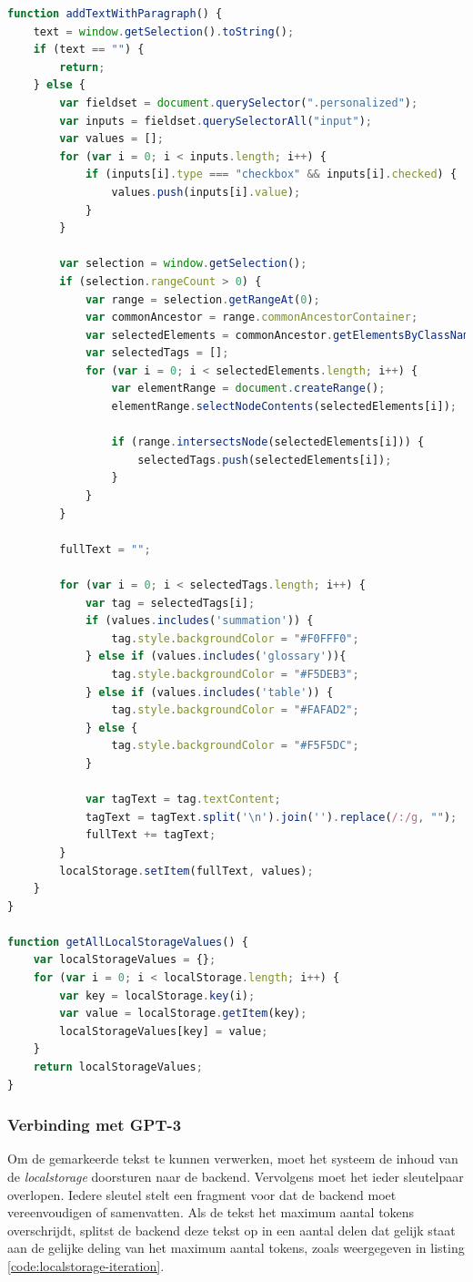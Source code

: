 \begin{lstlisting}[language=javascript, caption={Implementatie rond localstorage en tekst markeren.}, label={listing:localstorage}]
function addTextWithParagraph() {
	text = window.getSelection().toString();
	if (text == "") {
		return;
	} else {
		var fieldset = document.querySelector(".personalized");
		var inputs = fieldset.querySelectorAll("input");
		var values = [];
		for (var i = 0; i < inputs.length; i++) {
			if (inputs[i].type === "checkbox" && inputs[i].checked) {
				values.push(inputs[i].value);
			}
		}
		
		var selection = window.getSelection();
		if (selection.rangeCount > 0) {
			var range = selection.getRangeAt(0);
			var commonAncestor = range.commonAncestorContainer;
			var selectedElements = commonAncestor.getElementsByClassName("sentence");
			var selectedTags = [];
			for (var i = 0; i < selectedElements.length; i++) {
				var elementRange = document.createRange();
				elementRange.selectNodeContents(selectedElements[i]);
				
				if (range.intersectsNode(selectedElements[i])) {
					selectedTags.push(selectedElements[i]);
				}
			}
		}
		
		fullText = "";
		
		for (var i = 0; i < selectedTags.length; i++) {
			var tag = selectedTags[i];
			if (values.includes('summation')) {
				tag.style.backgroundColor = "#F0FFF0";
			} else if (values.includes('glossary')){
				tag.style.backgroundColor = "#F5DEB3";
			} else if (values.includes('table')) {
				tag.style.backgroundColor = "#FAFAD2";
			} else {
				tag.style.backgroundColor = "#F5F5DC";
			}
			
			var tagText = tag.textContent;
			tagText = tagText.split('\n').join('').replace(/:/g, "");
			fullText += tagText;
		}
		localStorage.setItem(fullText, values);
	}
}

function getAllLocalStorageValues() {
	var localStorageValues = {};
	for (var i = 0; i < localStorage.length; i++) {
		var key = localStorage.key(i);
		var value = localStorage.getItem(key);
		localStorageValues[key] = value;
	}
	return localStorageValues;
}
\end{lstlisting}

\subsubsection{Verbinding met GPT-3}

Om de gemarkeerde tekst te kunnen verwerken, moet het systeem de inhoud van de \textit{localstorage} doorsturen naar de backend. Vervolgens moet het ieder sleutelpaar overlopen. Iedere sleutel stelt een fragment voor dat de backend moet vereenvoudigen of samenvatten. Als de tekst het maximum aantal tokens overschrijdt, splitst de backend deze tekst op in een aantal delen dat gelijk staat aan de gelijke deling van het maximum aantal tokens, zoals weergegeven in listing \ref{code:localstorage-iteration}.


